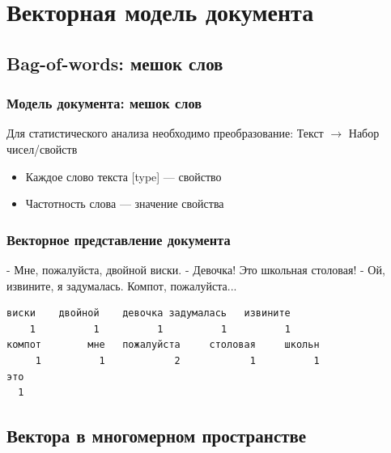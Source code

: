 \documentclass[svgnames]{beamer}
\begin{document}
\section{Векторная модель документа}

\subsection{Bag-of-words: мешок слов}

\begin{frame}
  \frametitle{Модель документа: мешок слов}

  \begin{block}{Для статистического анализа необходимо
      преобразование:}
      Текст $\longrightarrow$ Набор чисел/свойств
  \end{block}

  \begin{itemize}
  \item Каждое слово текста [type] — свойство
  \item Частотность слова — значение свойства
  \end{itemize}
\end{frame}

\begin{frame}[fragile]
  \frametitle{Векторное представление документа}
  \small
  \begin{block}{}
    - Мне, пожалуйста, двойной виски. - Девочка! Это школьная
    столовая! - Ой, извините, я задумалась. Компот, пожалуйста...
  \end{block}
  \footnotesize
\begin{verbatim}
виски    двойной    девочка задумалась   извините 
    1          1          1          1          1 
компот        мне   пожалуйста     столовая     школьн 
     1          1            2            1          1 
это 
  1 
\end{verbatim}
\end{frame}

\subsection{Вектора в многомерном пространстве}
\end{document}
